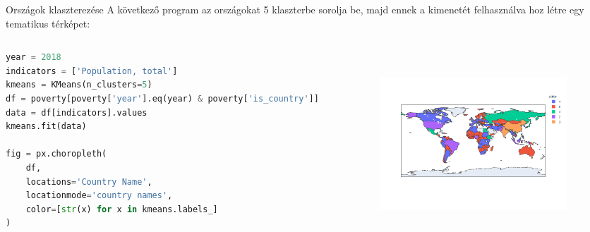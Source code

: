 \documentclass[english, aspectratio=169]{beamer}
\begin{document}
\begin{frame}[fragile]{Országok klaszterezése}
	A következő program az országokat 5 klaszterbe sorolja be, majd ennek a kimenetét felhasználva hoz létre egy tematikus térképet:\par\smallskip
	\begin{columns}
		\begin{column}{.5\textwidth}
			\begin{lstlisting}[language=python]
year = 2018
indicators = ['Population, total']
kmeans = KMeans(n_clusters=5)
df = poverty[poverty['year'].eq(year) & poverty['is_country']]
data = df[indicators].values
kmeans.fit(data)

fig = px.choropleth(
	df,
	locations='Country Name',
	locationmode='country names',
	color=[str(x) for x in kmeans.labels_]
)	
			\end{lstlisting}
		\end{column}
		\begin{column}{.5\textwidth}
			\begin{center}
				\includegraphics[width=7cm, height=7cm, keepaspectratio]{images/freq_16.png}
			\end{center}
		\end{column}
	\end{columns}
\end{frame}
\end{document}
